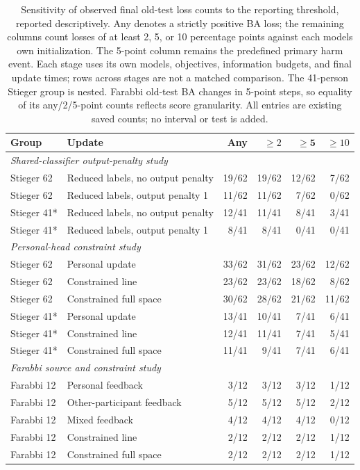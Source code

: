 \documentclass[11pt,a4paper]{article}
\begin{document}
\begin{table}[tbp]
\centering\small
\caption{Sensitivity of observed final old-test loss counts to the reporting threshold, reported descriptively. Any denotes a strictly positive BA loss; the remaining columns count losses of at least 2, 5, or 10 percentage points against each model\textquotesingle s own initialization. The 5-point column remains the predefined primary harm event. Each stage uses its own models, objectives, information budgets, and final update times; rows across stages are not a matched comparison. The 41-person Stieger group is nested. Farabbi old-test BA changes in 5-point steps, so equality of its any/2/5-point counts reflects score granularity. All entries are existing saved counts; no interval or test is added.}
\label{tab:old-loss-sensitivity}
\begin{tabular}{@{}llrrrr@{}}
\toprule
Group & Update & Any & $\geq2$ & $\mathbf{\geq5}$ & $\geq10$\\
\midrule
\multicolumn{6}{l}{\textit{Shared-classifier output-penalty study}}\\
Stieger 62 & Reduced labels, no output penalty & 19/62 & 19/62 & 12/62 & 7/62\\
Stieger 62 & Reduced labels, output penalty 1 & 11/62 & 11/62 & 7/62 & 0/62\\
Stieger 41* & Reduced labels, no output penalty & 12/41 & 11/41 & 8/41 & 3/41\\
Stieger 41* & Reduced labels, output penalty 1 & 8/41 & 8/41 & 0/41 & 0/41\\
\midrule
\multicolumn{6}{l}{\textit{Personal-head constraint study}}\\
Stieger 62 & Personal update & 33/62 & 31/62 & 23/62 & 12/62\\
Stieger 62 & Constrained line & 23/62 & 23/62 & 18/62 & 8/62\\
Stieger 62 & Constrained full space & 30/62 & 28/62 & 21/62 & 11/62\\
Stieger 41* & Personal update & 13/41 & 10/41 & 7/41 & 6/41\\
Stieger 41* & Constrained line & 12/41 & 11/41 & 7/41 & 5/41\\
Stieger 41* & Constrained full space & 11/41 & 9/41 & 7/41 & 6/41\\
\midrule
\multicolumn{6}{l}{\textit{Farabbi source and constraint study}}\\
Farabbi 12 & Personal feedback & 3/12 & 3/12 & 3/12 & 1/12\\
Farabbi 12 & Other-participant feedback & 5/12 & 5/12 & 5/12 & 2/12\\
Farabbi 12 & Mixed feedback & 4/12 & 4/12 & 4/12 & 0/12\\
Farabbi 12 & Constrained line & 2/12 & 2/12 & 2/12 & 1/12\\
Farabbi 12 & Constrained full space & 2/12 & 2/12 & 2/12 & 1/12\\
\bottomrule
\end{tabular}
\end{table}
\end{document}

